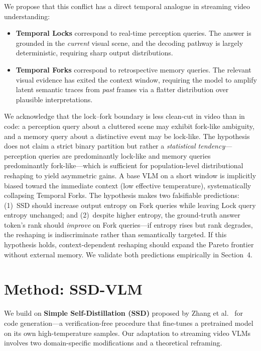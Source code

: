 \documentclass[11pt,a4paper]{article}
\begin{document}
We propose that this conflict has a direct temporal analogue in streaming video understanding:
\begin{itemize}
    \item \textbf{Temporal Locks} correspond to real-time perception queries. The answer is grounded in the \textit{current} visual scene, and the decoding pathway is largely deterministic, requiring sharp output distributions.
    \item \textbf{Temporal Forks} correspond to retrospective memory queries. The relevant visual evidence has exited the context window, requiring the model to amplify latent semantic traces from \textit{past} frames via a flatter distribution over plausible interpretations.
\end{itemize}

We acknowledge that the lock--fork boundary is less clean-cut in video than in code: a perception query about a cluttered scene may exhibit fork-like ambiguity, and a memory query about a distinctive event may be lock-like. The hypothesis does not claim a strict binary partition but rather a \textit{statistical tendency}---perception queries are predominantly lock-like and memory queries predominantly fork-like---which is sufficient for population-level distributional reshaping to yield asymmetric gains. A base VLM on a short window is implicitly biased toward the immediate context (low effective temperature), systematically collapsing Temporal Forks. The hypothesis makes two falsifiable predictions: (1)~SSD should increase output entropy on Fork queries while leaving Lock query entropy unchanged; and (2)~despite higher entropy, the ground-truth answer token's rank should \textit{improve} on Fork queries---if entropy rises but rank degrades, the reshaping is indiscriminate rather than semantically targeted. If this hypothesis holds, context-dependent reshaping should expand the Pareto frontier without external memory. We validate both predictions empirically in Section~4.

\section{Method: SSD-VLM}
We build on \textbf{Simple Self-Distillation (SSD)} proposed by Zhang et al.~\cite{ssd} for code generation---a verification-free procedure that fine-tunes a pretrained model on its own high-temperature samples. Our adaptation to streaming video VLMs involves two domain-specific modifications and a theoretical reframing.
\end{document}
